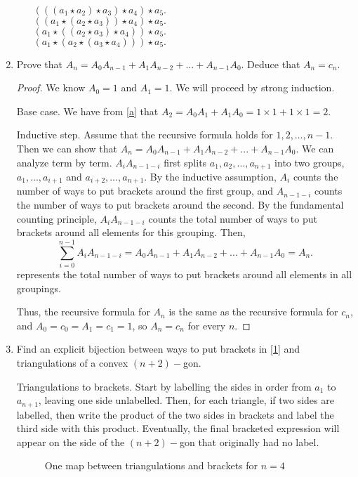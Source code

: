 \documentclass{article}
\begin{document}
\begin{enumerate}[label=(\alph*)]
\begin{enumerate}[label=(\roman*)]
        \\$(((a_1 \star a_2) \star a_3) \star a_4) \star a_5.$
        \\$((a_1 \star (a_2 \star a_3)) \star a_4) \star a_5.$
        \\$(a_1 \star ((a_2 \star a_3) \star a_4)) \star a_5.$
        \\$(a_1 \star (a_2 \star (a_3 \star a_4))) \star a_5.$
    \end{enumerate}
    \item Prove that $A_n=A_0A_{n-1}+A_1A_{n-2}+...+A_{n-1}A_0$. Deduce that $A_n=c_n$. 
    \begin{proof}
    We know $A_0=1$ and $A_1=1$. We will proceed by strong induction.
    \par Base case. We have from \ref{a} that $A_2=A_0A_1+A_1A_0=1\times 1+1\times 1=2.$
    \par Inductive step. Assume that the recursive formula holds for $1,2,\dots, n-1$. Then we can show that $A_n=A_0A_{n-1}+A_1A_{n-2}+...+A_{n-1}A_0$. We can analyze term by term. $A_iA_{n-1-i}$ first splits $a_1, a_2,\dots, a_{n+1}$ into two groups, $a_1,\dots,a_{i+1}$ and $a_{i+2},\dots,a_{n+1}$. By the inductive assumption, $A_i$ counts the number of ways to put brackets around the first group, and $A_{n-1-i}$ counts the number of ways to put brackets around the second. By the fundamental counting principle, $A_iA_{n-1-i}$ counts the total number of ways to put brackets around all elements for this grouping. Then,
    \[\sum_{i=0}^{n-1} A_iA_{n-1-i}=A_0A_{n-1}+A_1A_{n-2}+...+A_{n-1}A_0=A_n.\]
    represents the total number of ways to put brackets around all elements in all groupings.
    \par Thus, the recursive formula for $A_n$ is the same as the recursive formula for $c_n$, and $A_0=c_0=A_1=c_1=1$, so $A_n=c_n$ for every $n$.
    \end{proof}
    \item Find an explicit bijection between ways to put brackets in \eqref{1} and triangulations of a convex $(n+2)-$gon.
    \par Triangulations to brackets. Start by labelling the sides in order from $a_1$ to $a_{n+1}$, leaving one side unlabelled. Then, for each triangle, if two sides are labelled, then write the product of the two sides in brackets and label the third side with this product. Eventually, the final bracketed expression will appear on the side of the $(n+2)-$gon that originally had no label.
    
    \begin{figure}[ht]
        \centering
        
        \caption{One map between triangulations and brackets for $n=4$}
    \end{figure}


\end{enumerate}
\end{document}
